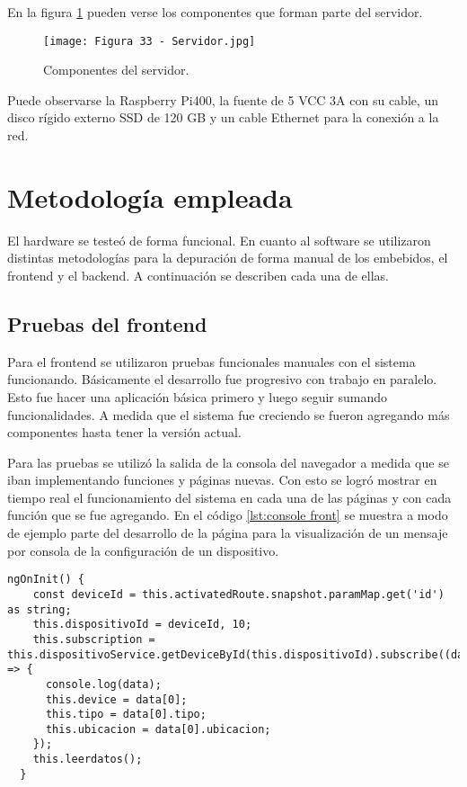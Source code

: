 En la figura \ref{fig:33} pueden verse los componentes que forman parte del servidor.

\begin{figure}[h]
\centering
\texttt{[image: Figura 33 - Servidor.jpg]}
\caption[Servidor]{Componentes del servidor.}
\label{fig:33}
\end{figure}

Puede observarse la Raspberry Pi400, la fuente de 5 VCC 3A con su cable, un disco rígido externo SSD de 120 GB y un cable Ethernet para la conexión a la red.

\section{Metodología empleada}

El hardware se testeó de forma funcional. En cuanto al software se utilizaron distintas metodologías para la depuración de forma manual de los embebidos, el frontend y el backend. A continuación se describen cada una de ellas.

\subsection{Pruebas del frontend}

Para el frontend se utilizaron pruebas funcionales manuales con el sistema funcionando. Básicamente el desarrollo fue progresivo con trabajo en paralelo. Esto fue hacer una aplicación básica primero y luego seguir sumando funcionalidades. A medida que el sistema fue creciendo se fueron agregando más componentes hasta tener la versión actual.

Para las pruebas se utilizó la salida de la consola del navegador a medida que se iban implementando funciones y páginas nuevas. Con esto se logró mostrar en tiempo real el funcionamiento del sistema en cada una de las páginas y con cada función que se fue agregando. En el código \ref{lst:console front} se muestra a modo de ejemplo parte del desarrollo de la página para la visualización de un mensaje por consola de la configuración de un dispositivo.

\begin{lstlisting}[caption={Muestra por consola de los datos recibidos}, label={lst:console front}]
ngOnInit() {
    const deviceId = this.activatedRoute.snapshot.paramMap.get('id') as string;
    this.dispositivoId = deviceId, 10;
    this.subscription = this.dispositivoService.getDeviceById(this.dispositivoId).subscribe((data) => {
      console.log(data);
      this.device = data[0];
      this.tipo = data[0].tipo;
      this.ubicacion = data[0].ubicacion;
    });
    this.leerdatos();
  }
\end{lstlisting}

